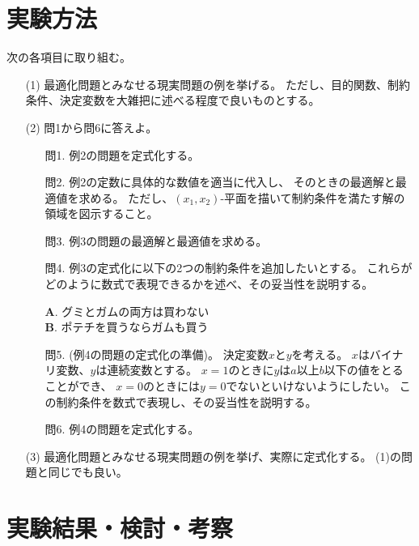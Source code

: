 \documentclass[12pt]{jarticle}
\begin{document}
\section{実験方法}
次の各項目に取り組む。
\begin{itemize}
    \item[(1)] 最適化問題とみなせる現実問題の例を挙げる。
          ただし、目的関数、制約条件、決定変数を大雑把に述べる程度で良いものとする。
    \item[(2)]問1から問6に答えよ。
          \begin{itemize}
              \item[問1.] 例2の問題を定式化する。
              \item[問2.] 例2の定数に具体的な数値を適当に代入し、
                    そのときの最適解と最適値を求める。
                    ただし、$(x_1,x_2)$-平面を描いて制約条件を満たす解の領域を図示すること。
              \item[問3.] 例3の問題の最適解と最適値を求める。
              \item[問4.] 例3の定式化に以下の2つの制約条件を追加したいとする。
                    これらがどのように数式で表現できるかを述べ、その妥当性を説明する。
                    \begin{center}
                        \textbf{A}. グミとガムの両方は買わない\\
                        \textbf{B}. ポテチを買うならガムも買う\\
                    \end{center}
              \item[問5.] (例4の問題の定式化の準備)。
                    決定変数$x$と$y$を考える。
                    $x$はバイナリ変数、$y$は連続変数とする。
                    $x=1$のときに$y$は$a$以上$b$以下の値をとることができ、
                    $x=0$のときには$y=0$でないといけないようにしたい。
                    この制約条件を数式で表現し、その妥当性を説明する。
              \item[問6.] 例4の問題を定式化する。
          \end{itemize}

    \item[(3)]最適化問題とみなせる現実問題の例を挙げ、実際に定式化する。
          (1)の問題と同じでも良い。
\end{itemize}

\section{実験結果・検討・考察}
\end{document}
